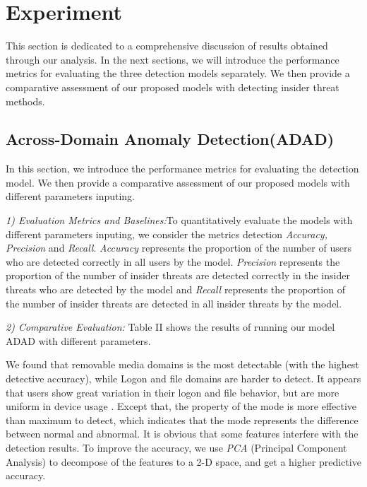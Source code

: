 \documentclass[conference]{IEEEtran}
\begin{document}
\section{Experiment}

This section is dedicated to a comprehensive discussion of results obtained through our analysis.
In the next sections, we will introduce the performance metrics for evaluating the three detection models separately. We then provide a comparative assessment of our proposed models with detecting insider threat methods. 


\subsection{Across-Domain Anomaly Detection(ADAD)}\label{AA}
In this section, we introduce the performance metrics for
evaluating the detection model. We then provide a
comparative assessment of our proposed models with different parameters inputing. 


\emph{1) Evaluation Metrics and Baselines:}To quantitatively evaluate the models with different parameters inputing, we consider the metrics detection \emph{Accuracy, Precision} and \emph{Recall}. 
\emph{Accuracy} represents the proportion of the number of users who are detected correctly in all users by the model. \emph{Precision} represents the proportion of the number of insider threats are detected correctly in the insider threats who are detected by the model and \emph{Recall} represents the proportion of the number of insider threats are detected in all insider threats by the model.

\emph{2) Comparative Evaluation:} Table II shows the results of running our model ADAD with different parameters.

We found that removable media domains is the most detectable (with the highest detective accuracy), while Logon and file domains are harder to detect. It appears that users show great variation in their logon and file behavior, but are more uniform in device usage . Except that, the property of the mode is more effective than maximum to detect, which indicates that the mode  represents the difference between normal and abnormal. It is obvious that some features interfere with the detection results. To improve the accuracy, we use \emph{PCA} (Principal Component Analysis) to decompose of the features to a 2-D space, and get a higher predictive accuracy.
\end{document}
